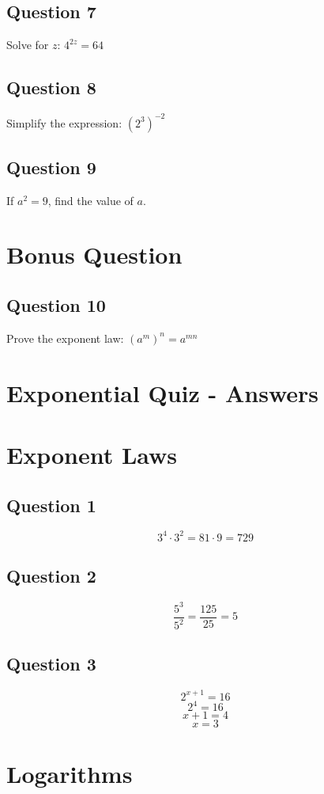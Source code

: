 \documentclass[12pt]{article}
\begin{document}
\subsection*{Question 7}
Solve for $z$: $4^{2z} = 64$

\subsection*{Question 8}
Simplify the expression: $(2^3)^{-2}$

\subsection*{Question 9}
If $a^2 = 9$, find the value of $a$.

\section*{Bonus Question}

\subsection*{Question 10}
Prove the exponent law: $(a^m)^n = a^{mn}$


\newpage
\section*{Exponential Quiz - Answers}
\section*{Exponent Laws}

\subsection*{Question 1}
\[3^4 \cdot 3^2 = 81 \cdot 9 = 729\]

\subsection*{Question 2}
\[\frac{5^3}{5^2} = \frac{125}{25} = 5\]

\subsection*{Question 3}
\[2^{x+1} = 16\]
\[2^4 = 16\]
\[x + 1 = 4\]
\[x = 3\]

\section*{Logarithms}
\end{document}
